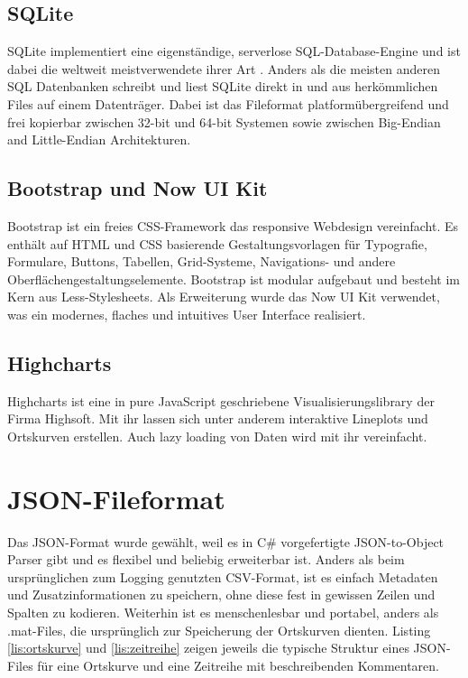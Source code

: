 \subsection{SQLite}

SQLite implementiert eine eigenständige, serverlose SQL-Database-Engine und ist dabei die weltweit meistverwendete ihrer Art \cite{sqlite}. Anders als die meisten anderen SQL Datenbanken schreibt und liest SQLite direkt in und aus herkömmlichen Files auf einem Datenträger. Dabei ist das Fileformat platformübergreifend und frei kopierbar zwischen 32-bit und 64-bit Systemen sowie zwischen Big-Endian and Little-Endian Architekturen.


\subsection{Bootstrap und Now UI Kit}

Bootstrap \cite{bootstrap} ist ein freies CSS-Framework das responsive Webdesign vereinfacht. Es enthält auf HTML und CSS basierende Gestaltungsvorlagen für Typografie, Formulare, Buttons, Tabellen, Grid-Systeme, Navigations- und andere Oberflächengestaltungselemente. Bootstrap ist modular aufgebaut und besteht im Kern aus Less-Stylesheets. Als Erweiterung wurde das Now UI Kit \cite{nowUIkit} verwendet, was ein modernes, flaches und intuitives User Interface realisiert.

\subsection{Highcharts}

Highcharts \cite{highCharts} ist eine in pure JavaScript geschriebene Visualisierungslibrary der Firma Highsoft. Mit ihr lassen sich unter anderem interaktive Lineplots und Ortskurven erstellen. Auch lazy loading von Daten wird mit ihr vereinfacht.

\section{JSON-Fileformat}

Das JSON-Format wurde gewählt, weil es in C\# vorgefertigte JSON-to-Object Parser gibt und es flexibel und beliebig erweiterbar ist. Anders als beim ursprünglichen zum Logging genutzten CSV-Format, ist es einfach Metadaten und Zusatzinformationen zu speichern, ohne diese fest in gewissen Zeilen und Spalten zu kodieren. Weiterhin ist es menschenlesbar und portabel, anders als .mat-Files, die ursprünglich zur Speicherung der Ortskurven dienten. Listing \ref{lis:ortskurve} und \ref{lis:zeitreihe} zeigen jeweils die typische Struktur eines JSON-Files für eine Ortskurve und eine Zeitreihe mit beschreibenden Kommentaren.


